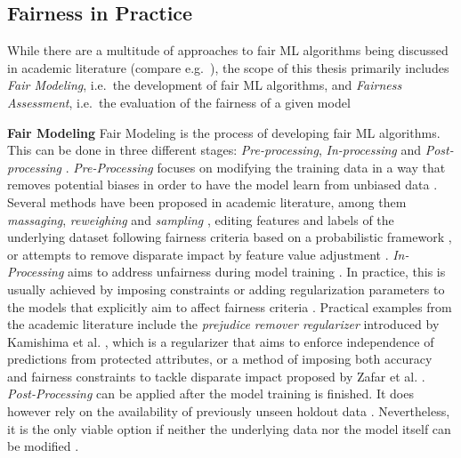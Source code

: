 \subsection{Fairness in Practice}\label{subsec:practice}

While there are a multitude of approaches to fair ML algorithms being discussed in academic literature (compare e.g.\ \cite{Mehrabi2021}), the scope of this thesis primarily includes \textit{Fair Modeling}, i.e.\ the development of fair ML algorithms, and \textit{Fairness Assessment}, i.e.\ the evaluation of the fairness of a given model



\textbf{Fair Modeling} \newline
Fair Modeling is the process of developing fair ML algorithms. This can be done in three different stages: \textit{Pre-processing}, \textit{In-processing} and \textit{Post-processing} \parencite{Pessach2020}. \newline
\textit{Pre-Processing} focuses on modifying the training data in a way that removes potential biases in order to have the model learn from unbiased data \parencite{Bellamy2019}.
Several methods have been proposed in academic literature, among them \textit{massaging}, \textit{reweighing} and \textit{sampling} \parencite{Kamiran2012}, editing features and labels of the underlying dataset following fairness criteria based on a probabilistic framework \parencite{Calmon2017}, or attempts to remove disparate impact by feature value adjustment \parencite{Feldman2015}. \newline
\textit{In-Processing} aims to address unfairness during model training \parencite{Alessandro2017}. In practice, this is usually achieved by imposing constraints or adding regularization parameters to the models that explicitly aim to affect fairness criteria \parencite{Pessach2020}.
Practical examples from the academic literature include the \textit{prejudice remover regularizer} introduced by Kamishima et al. \parencite{Kamishima2012}, which is a regularizer that aims to enforce independence of predictions from protected attributes, or a method of imposing both accuracy and fairness constraints to tackle disparate impact proposed by Zafar et al. \parencite{Zafar2017}. \newline
\textit{Post-Processing} can be applied after the model training is finished. It does however rely on the availability of previously unseen holdout data \parencite{Alessandro2017}. Nevertheless, it is the only viable option if neither the underlying data nor the model itself can be modified \parencite{Bellamy2019}.
